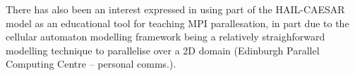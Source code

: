 \begin{itemize}
There has also been an interest expressed in using part of the HAIL-CAESAR model as an educational tool for teaching MPI parallesation, in part due to the cellular automaton modelling framework being a relatively straighforward modelling technique to parallelise over a 2D domain (Edinburgh Parallel Computing Centre -- personal comms.).

\end{itemize}
